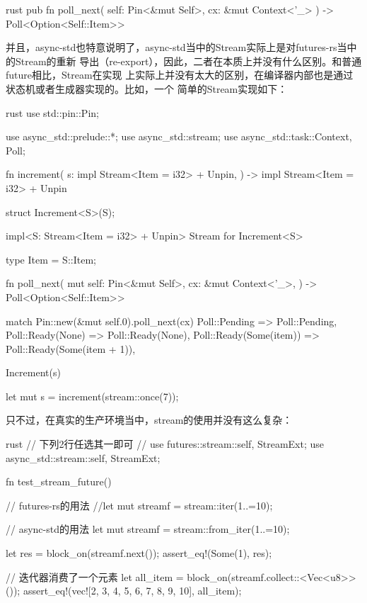 \begin{code-block}{rust}
pub fn poll_next(
    self: Pin<&mut Self>,
    cx: &mut Context<'_>
) -> Poll<Option<Self::Item>>
\end{code-block}
并且，async-std也特意说明了，async-std当中的Stream实际上是对futures-rs当中的Stream的重新
导出（re-export），因此，二者在本质上并没有什么区别。和普通future相比，Stream在实现
上实际上并没有太大的区别，在编译器内部也是通过状态机或者生成器实现的。比如，一个
简单的Stream实现如下：
\begin{code-block}{rust}
use std::pin::Pin;

use async_std::prelude::*;
use async_std::stream;
use async_std::task::{Context, Poll};

fn increment(
    s: impl Stream<Item = i32> + Unpin,
) -> impl Stream<Item = i32> + Unpin {

    struct Increment<S>(S);

    impl<S: Stream<Item = i32> + Unpin> Stream for Increment<S> {

        type Item = S::Item;

        fn poll_next(
            mut self: Pin<&mut Self>,
            cx: &mut Context<'_>,
        ) -> Poll<Option<Self::Item>> {

            match Pin::new(&mut self.0).poll_next(cx) {
                Poll::Pending => Poll::Pending,
                Poll::Ready(None) => Poll::Ready(None),
                Poll::Ready(Some(item)) => Poll::Ready(Some(item + 1)),
            }
        }
    }

    Increment(s)
}

let mut s = increment(stream::once(7));
\end{code-block}
只不过，在真实的生产环境当中，stream的使用并没有这么复杂：
\begin{code-block}{rust}
// 下列2行任选其一即可
// use futures::stream::{self, StreamExt};
use async_std::stream::{self, StreamExt};

fn test_stream_future() {
    // futures-rs的用法
    //let mut streamf = stream::iter(1..=10);

    // async-std的用法
    let mut streamf = stream::from_iter(1..=10);

    let res = block_on(streamf.next());
    assert_eq!(Some(1), res);

    // 迭代器消费了一个元素
    let all_item = block_on(streamf.collect::<Vec<u8>>());
    assert_eq!(vec![2, 3, 4, 5, 6, 7, 8, 9, 10], all_item);
}
\end{code-block}
